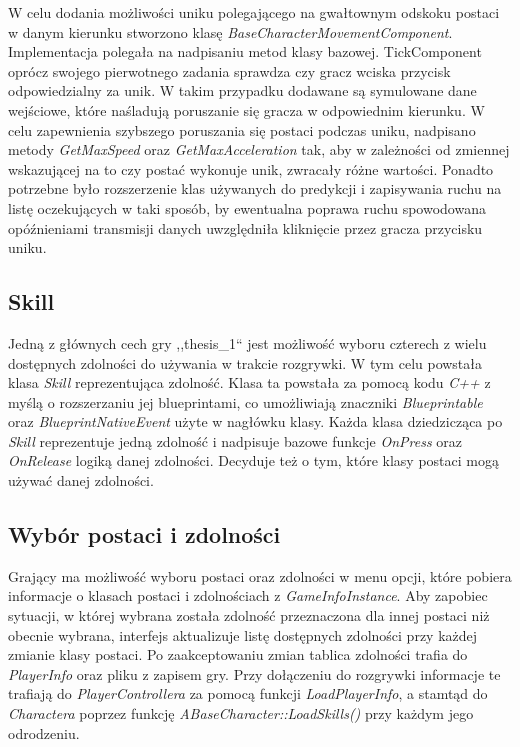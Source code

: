 \documentclass[multip]{SGGW-thesis}
\begin{document}
W celu dodania możliwości uniku polegającego na gwałtownym odskoku postaci w danym kierunku stworzono klasę {\em BaseCharacterMovementComponent}. Implementacja polegała na nadpisaniu metod klasy bazowej\cite{uewiki-charmovement}. TickComponent oprócz swojego pierwotnego zadania sprawdza czy gracz wciska przycisk odpowiedzialny za unik. W takim przypadku dodawane są symulowane dane wejściowe, które naśladują poruszanie się gracza w odpowiednim kierunku. W celu zapewnienia szybszego poruszania się postaci podczas uniku, nadpisano metody {\em GetMaxSpeed} oraz {\em GetMaxAcceleration} tak, aby w zależności od zmiennej wskazującej na to czy postać wykonuje unik, zwracały różne wartości. Ponadto potrzebne było rozszerzenie klas używanych do predykcji i zapisywania ruchu na listę oczekujących w taki sposób, by ewentualna poprawa ruchu spowodowana opóźnieniami transmisji danych uwzględniła kliknięcie przez gracza przycisku uniku.
\clearpage
	\subsection{Skill}
	Jedną z głównych cech gry ,,thesis\_1`` jest możliwość wyboru czterech z wielu dostępnych zdolności do używania w trakcie rozgrywki. W tym celu powstała klasa {\em Skill} reprezentująca zdolność. Klasa ta powstała za pomocą kodu {\em C++} z myślą o rozszerzaniu jej blueprintami, co umożliwiają znaczniki {\em Blueprintable} oraz {\em BlueprintNativeEvent} użyte w nagłówku klasy. Każda klasa dziedzicząca po {\em Skill} reprezentuje jedną zdolność i nadpisuje bazowe funkcje {\em OnPress} oraz {\em OnRelease} logiką danej zdolności. Decyduje też o tym, które klasy postaci mogą używać danej zdolności.
	\subsection{Wybór postaci i zdolności}
		\label{wybor-postaci}
	Grający ma możliwość wyboru postaci oraz zdolności w menu opcji, które pobiera informacje o klasach postaci i zdolnościach z {\em GameInfoInstance}. Aby zapobiec sytuacji, w której wybrana została zdolność przeznaczona dla innej postaci niż obecnie wybrana, interfejs aktualizuje listę dostępnych zdolności przy każdej zmianie klasy postaci. Po zaakceptowaniu zmian tablica zdolności trafia do {\em PlayerInfo} oraz pliku z zapisem gry. Przy dołączeniu do rozgrywki informacje te trafiają do {\em PlayerControllera} za pomocą funkcji {\em LoadPlayerInfo}, a stamtąd do {\em Charactera} poprzez funkcję {\em ABaseCharacter::LoadSkills()} przy każdym jego odrodzeniu.
\end{document}
